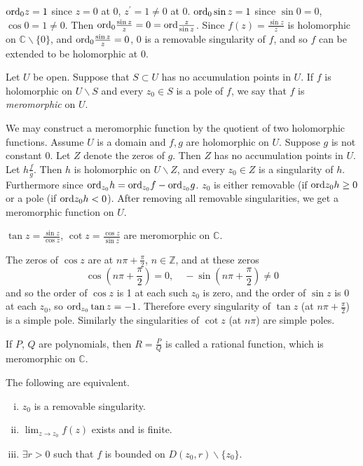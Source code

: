 \begin{xmpl}
$\mathrm{ord}_0 z = 1$ since $z = 0$ at 0, $z^\prime = 1 \neq 0$ at 0.
$\mathrm{ord}_0 \sin z = 1$ since $\sin 0 = 0$, $\cos 0 = 1 \neq 0$.
Then $\mathrm{ord}_0 \frac{\sin z}{z} = 0 = \mathrm{ord} \frac{z}{\sin z}$.
Since $f(z) = \frac{\sin z}{z}$ is holomorphic on
$\mathbb{C} \backslash \{ 0 \}$, and
$\mathrm{ord}_0 \frac{\sin z}{z} = 0$, 0 is a removable singularity of
$f$, and so $f$ can be extended to be holomorphic at 0.
\end{xmpl}

\begin{defn}
Let $U$ be open. Suppose that $S \subset U$ has no accumulation points
in $U$. If $f$ is holomorphic on $U \backslash S$ and every $z_0 \in
S$
is a pole of $f$, we say that $f$ is \emph{meromorphic} on $U$.
\end{defn}

We may construct a meromorphic function by the quotient of two
holomorphic functions. Assume $U$ is a domain and $f, g$ are
holomorphic on $U$. Suppose $g$ is not constant 0. Let $Z$ denote
the zeros of $g$. Then $Z$ has no accumulation points in $U$.
Let $h \frac{f}{g}$. Then $h$ is holomorphic on $U \backslash Z$,
and every $z_0 \in Z$ is a singularity of $h$. Furthermore since
$\mathrm{ord}_{z_0} h = \mathrm{ord}_{z_0} f - \mathrm{ord}_{z_0} g$. $z_0$ is either
removable (if $\mathrm{ord} z_0 h \geq 0$ or a pole (if $\mathrm{ord} z_0 h < 0$).
After removing all removable singularities, we get a meromorphic
function on $U$.

\begin{xmpl}
$\tan z = \frac{\sin z}{\cos z}$, $\cot z = \frac{\cos z}{\sin z}$
are meromorphic on $\mathbb{C}$.

The zeros of $\cos z$ are at $n \pi + \frac{\pi}{2}$, $n \in
\mathbb{Z}$, and at these zeros
$$
\cos(n \pi + \frac{\pi}{2}) = 0, \quad
-\sin(n \pi + \frac{\pi}{2}) \neq 0
$$
and so the order of $\cos z$ is 1 at each such $z_0$ is
zero, and the order of $\sin z$ is 0 at each $z_0$, so
$\mathrm{ord}_{z_0} \tan z = -1$. Therefore every singularity of
$\tan z$ (at $n \pi + \frac{\pi}{2}$) is a simple pole.
Similarly the singularities of $\cot z$ (at $n \pi$)
are simple poles.
\end{xmpl}

\begin{defn}
If $P$, $Q$ are polynomials, then $R = \frac{P}{Q}$ is called a
rational function, which is meromorphic on $\mathbb{C}$.
\end{defn}

\begin{theorem}
  The following are equivalent.
  \begin{enumerate}[(i)]
    \item
      {
        $z_0$ is a removable singularity.
      }
    \item
      {
        $\lim_{z \to z_0} f(z)$ exists and is finite.
      }
    \item
      {
        $\exists r > 0$ such that $f$ is bounded on
        $D(z_0, r) \backslash \{ z_0 \}$.
      }
  \end{enumerate}
\end{theorem}

